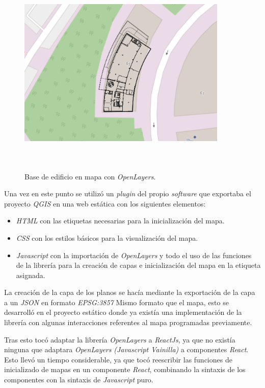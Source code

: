 \begin{figure}[t]
    \centering
    \includegraphics[width=10cm,height=10cm,keepaspectratio]{img/Base Edificio.png}
    \caption{Base de edificio en mapa con \textit{OpenLayers}.}
    \label{fig:Example OpenLayers}
\end{figure}
Una vez en este punto se utilizó un \textit{plugin} del propio \textit{software} que exportaba el proyecto \textit{QGIS} en una web estática con los siguientes elementos:

\begin{itemize}
    \item \textit{HTML} con las etiquetas necesarias para la inicialización del mapa.
    \item \textit{CSS} con los estilos básicos para la visualización del mapa.
    \item \textit{Javascript} con la importación de \textit{OpenLayers} y todo el uso de las funciones de la librería para la creación de capas e inicialización del mapa en la etiqueta asignada.
\end{itemize}

La creación de la capa de los planos se hacía mediante la exportación de la capa a un \textit{JSON} en formato \textit{EPSG:3857} Mismo formato que el mapa, esto se desarrolló en el proyecto estático donde ya existía una implementación de la librería con algunas interacciones referentes al mapa programadas previamente.

Tras esto tocó adaptar la librería \textit{OpenLayers} a \textit{ReactJs}, ya que no existía ninguna que adaptara \textit{OpenLayers} \textit{(Javascript Vainilla)} a componentes \textit{React}. Esto llevó un tiempo considerable, ya que tocó reescribir las funciones de inicializado de mapas en un componente \textit{React}, combinando la sintaxis de los componentes con la sintaxis de \textit{Javascript} puro.


